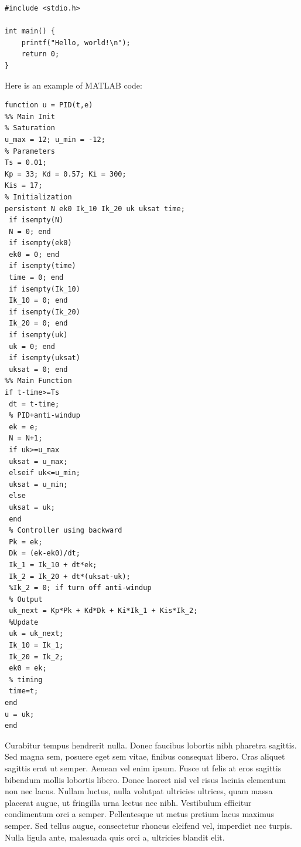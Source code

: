 \documentclass{article}
\begin{document}
\begin{lstlisting}[style=c]
#include <stdio.h>

int main() {
    printf("Hello, world!\n");
    return 0;
}
\end{lstlisting}

Here is an example of MATLAB code:

\begin{lstlisting}[style=matlab]
function u = PID(t,e) 
%% Main Init
% Saturation
u_max = 12; u_min = -12; 
% Parameters
Ts = 0.01; 
Kp = 33; Kd = 0.57; Ki = 300; 
Kis = 17; 
% Initialization
persistent N ek0 Ik_10 Ik_20 uk uksat time; 
 if isempty(N) 
 N = 0; end
 if isempty(ek0) 
 ek0 = 0; end
 if isempty(time) 
 time = 0; end
 if isempty(Ik_10) 
 Ik_10 = 0; end
 if isempty(Ik_20) 
 Ik_20 = 0; end
 if isempty(uk) 
 uk = 0; end
 if isempty(uksat) 
 uksat = 0; end 
%% Main Function
if t-time>=Ts 
 dt = t-time; 
 % PID+anti-windup
 ek = e; 
 N = N+1; 
 if uk>=u_max 
 uksat = u_max; 
 elseif uk<=u_min; 
 uksat = u_min; 
 else
 uksat = uk; 
 end
 % Controller using backward
 Pk = ek; 
 Dk = (ek-ek0)/dt; 
 Ik_1 = Ik_10 + dt*ek; 
 Ik_2 = Ik_20 + dt*(uksat-uk); 
 %Ik_2 = 0; if turn off anti-windup
 % Output
 uk_next = Kp*Pk + Kd*Dk + Ki*Ik_1 + Kis*Ik_2; 
 %Update
 uk = uk_next; 
 Ik_10 = Ik_1; 
 Ik_20 = Ik_2; 
 ek0 = ek; 
 % timing
 time=t; 
end
u = uk; 
end
\end{lstlisting}

Curabitur tempus hendrerit nulla. Donec faucibus lobortis nibh pharetra sagittis. Sed magna sem, posuere eget sem vitae, finibus consequat libero. Cras aliquet sagittis erat ut semper. Aenean vel enim ipsum. Fusce ut felis at eros sagittis bibendum mollis lobortis libero. Donec laoreet nisl vel risus lacinia elementum non nec lacus. Nullam luctus, nulla volutpat ultricies ultrices, quam massa placerat augue, ut fringilla urna lectus nec nibh. Vestibulum efficitur condimentum orci a semper. Pellentesque ut metus pretium lacus maximus semper. Sed tellus augue, consectetur rhoncus eleifend vel, imperdiet nec turpis. Nulla ligula ante, malesuada quis orci a, ultricies blandit elit.
\end{document}
